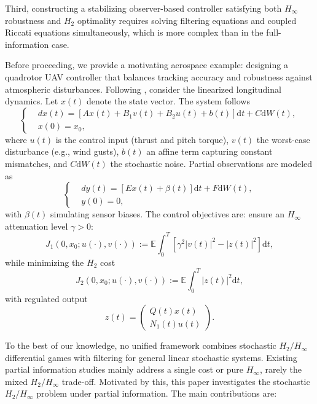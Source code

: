 \documentclass[lettersize,journal]{IEEEtran}
\theoremstyle{plain}
\theoremstyle{definition}
\begin{document}
Third, constructing a stabilizing observer-based controller satisfying both $H_\infty$ robustness and $H_2$ optimality requires solving filtering equations and coupled Riccati equations simultaneously, which is more complex than in the full-information case.

Before proceeding, we provide a motivating aerospace example: designing a quadrotor UAV controller that balances tracking accuracy and robustness against atmospheric disturbances. Following \cite{Shi2018,Qi2025,Hui2024,Hasanlu2025,Ming2023}, consider the linearized longitudinal dynamics. Let $x(t)$ denote the state vector. The system follows
\begin{equation*}
	\left\{
	\begin{aligned}
		&dx(t) = [Ax(t) + B_1 v(t) + B_2 u(t) + b(t)]\mathrm{d}t + C \mathrm{d}W(t),\\
		&x(0) = x_0,
	\end{aligned}
	\right.
\end{equation*}
where $u(t)$ is the control input (thrust and pitch torque), $v(t)$ the worst-case disturbance (e.g., wind gusts), $b(t)$ an affine term capturing constant mismatches, and $C \mathrm{d}W(t)$ the stochastic noise. Partial observations are modeled as
\begin{equation*}
	\left\{
	\begin{aligned}
		&dy(t) = [Ex(t) + \beta(t)]\mathrm{d}t + F \mathrm{d}W(t),\\
		&y(0) = 0,
	\end{aligned}
	\right.
\end{equation*}
with $\beta(t)$ simulating sensor biases. The control objectives are: ensure an $H_\infty$ attenuation level $\gamma>0$:
\begin{equation*}
	J_1(0, x_0; u(\cdot), v(\cdot)) := \mathbb{E} \int_{0}^{T} [\gamma^2 |v(t)|^2 - |z(t)|^2]\mathrm{d}t,
\end{equation*}
while minimizing the $H_2$ cost
\begin{equation*}
	J_2(0, x_0; u(\cdot), v(\cdot)) := \mathbb{E} \int_{0}^{T} |z(t)|^2 \mathrm{d}t,
\end{equation*}
with regulated output
\[
z(t) = \begin{pmatrix} Q(t)x(t)\\ N_1(t)u(t) \end{pmatrix}.
\]

To the best of our knowledge, no unified framework combines stochastic $H_2/H_\infty$ differential games with filtering for general linear stochastic systems. Existing partial information studies mainly address a single cost or pure $H_\infty$, rarely the mixed $H_2/H_\infty$ trade-off. Motivated by this, this paper investigates the stochastic $H_2/H_\infty$ problem under partial information. The main contributions are:
\end{document}
